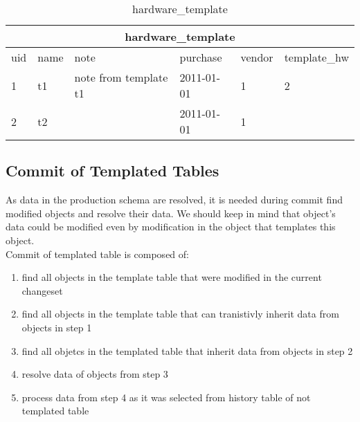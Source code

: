 \documentclass[deska]{subfiles}
\begin{document}
\begin{center}
\begin{table}
    \caption{hardware\_template}
    \label{tab-templ-hwtempl}
\begin{tabular}{ | l | l | l | l | l | l |}
    \hline
    \multicolumn{6}{|c|}{hardware\_template}\\
    \hline
    uid & name & note & purchase & vendor & template\_hw\\
    \hline
    1 & t1 & note from template t1 & 2011-01-01 & 1 & 2\\
    2 & t2 &  & 2011-01-01 & 1 & \\
    \hline
\end{tabular}
\end{table}

\end{center}

\subsection{Commit of Templated Tables}
As data in the production schema are resolved, it is needed during commit find modified objects and resolve their data. We should keep in mind that object's data could be modified even by modification in the object that templates this object.\\
Commit of templated table is composed of:
\begin{enumerate}
    \item find all objects in the template table that were modified in the current changeset
    \item find all objects in the template table that can tranistivly inherit data from objects in step 1
    \item find all objetcs in the templated table that inherit data from objects in step 2
    \item resolve data of objects from step 3
    \item process data from step 4 as it was selected from history table of not templated table
\end{enumerate}
\end{document}
